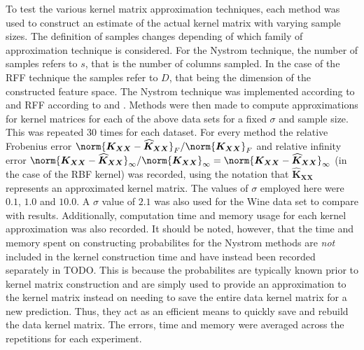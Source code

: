 To test the various kernel matrix approximation techniques, each method was used to construct an estimate of the actual kernel matrix with varying sample sizes. The definition of samples changes depending of which family of approximation technique is considered. For the Nystrom technique, the number of samples refers to $s$, that is the number of columns sampled. In the case of the RFF technique the samples refer to $D$, that being the dimension of the constructed feature space. The Nystrom technique was implemented according to \cite{JMLR:v6:drineas05a} and RFF according to \cite{NIPS2007_013a006f} and \cite{LiuFanghui2021RFfK}. Methods were then made to compute approximations for kernel matrices for each of the above data sets for a fixed $\sigma$ and sample size. This was repeated 30 times for each dataset. For every method the relative Frobenius error $\norm{\bm{K_{XX}} - \widehat{\bm{K}}_{\bm{XX}}}_{F} / \norm{\bm{K_{XX}}}_{F}$ and relative infinity error $\norm{\bm{K_{XX}} - \widehat{\bm{K}}_{\bm{XX}}}_{\infty} / \norm{\bm{K_{XX}}}_{\infty} = \norm{\bm{K_{XX}} - \widehat{\bm{K}}_{\bm{XX}}}_{\infty}$ (in the case of the RBF kernel) was recorded, using the notation that $\widehat{\bm{K}}_{\bm{XX}}$ represents an approximated kernel matrix. The values of $\sigma$ employed here were $0.1$, $1.0$ and $10.0$. A $\sigma$ value of $2.1$ was also used for the Wine data set to compare with \cite{JMLR:v6:drineas05a} results. Additionally, computation time and memory usage for each kernel approximation was also recorded. It should be noted, however, that the time and memory spent on constructing probabilites for the Nystrom methods are {\it not} included in the kernel construction time and have instead been recorded separately in TODO. This is because the probabilites are typically known prior to kernel matrix construction and are simply used to provide an approximation to the kernel matrix instead on needing to save the entire data kernel matrix for a new prediction. Thus, they act as an efficient means to quickly save and rebuild the data kernel matrix. The errors, time and memory were averaged across the repetitions for each experiment.


